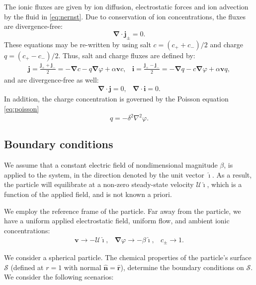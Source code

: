 \documentclass[10pt]{ijnam}
\newcommand\Laplacian{\nabla^2}
\newcommand\bnabla{\boldsymbol{\nabla}}
\newcommand\bv{\boldsymbol{v}}
\newcommand\bn{\boldsymbol{\hat{n}}}
\newcommand\bj{\boldsymbol{j}}
\newcommand\bi{\boldsymbol{i}}
\newcommand\br{\boldsymbol{r}}
\newcommand\brhat{\hat{\br}}
\newcommand\cU{\mathscr{U}}
\newcommand\ui{\boldsymbol{\hat{\imath}}}
\begin{document}
The ionic fluxes are given by ion diffusion, electrostatic forces and ion advection by the fluid
in \eqref{eq:nernst}. Due to conservation of ion concentrations, the fluxes are divergence-free:
\begin{equation*}
\bnabla \cdot \bj_\pm = 0.
\end{equation*}
These equations may be re-written by using salt $c = (c_+ + c_-)/2$ and charge $q = (c_+ - c_-)/2$.
Thus, salt and charge fluxes are defined by:
\begin{equation}\label{eq:fluxes}\begin{array}{cc}
  \bj = \frac{\bj_+ + \bj_-}{2} = -\bnabla c - q \bnabla \varphi + \alpha \bv c, & 
  \bi = \frac{\bj_+ - \bj_-}{2} = -\bnabla q - c \bnabla \varphi + \alpha \bv q,
\end{array}\end{equation}
and are divergence-free as well:
\begin{equation}\label{eq:zero_flux}\begin{array}{cc}
\bnabla \cdot \bj = 0, & 
\bnabla \cdot \bi = 0. 
\end{array}\end{equation}
In addition, the charge concentration is governed by the Poisson equation \eqref{eq:poisson}
\begin{equation}
q = -\delta^2 \Laplacian \varphi.
\end{equation}

\subsection{Boundary conditions}
We assume that a constant electric field of nondimensional magnitude $\beta$,
is applied to the system, in the direction denoted by the unit vector $\ui$.
As a result, the particle will equilibrate at 
a non-zero steady-state velocity $\cU \ui$, which is
a function of the applied field, and is not known a priori.

We employ the reference frame of the particle.
Far away from the particle, we have a uniform applied electrostatic field, uniform flow,
and ambient ionic concentrations:
\begin{equation}\label{eq:bndcond_inf}\begin{array}{ccc}
\bv \rightarrow -\cU \ui, &
\bnabla \varphi \rightarrow -\beta\ui, &
 c_\pm \rightarrow 1.
\end{array}\end{equation}

We consider a spherical particle.
The chemical properties of the particle's surface $\mathcal{S}$ (defined at $r=1$ 
with normal $\bn = \brhat$), determine the boundary conditions on $\mathcal{S}$.
We consider the following scenarios:
\end{document}
